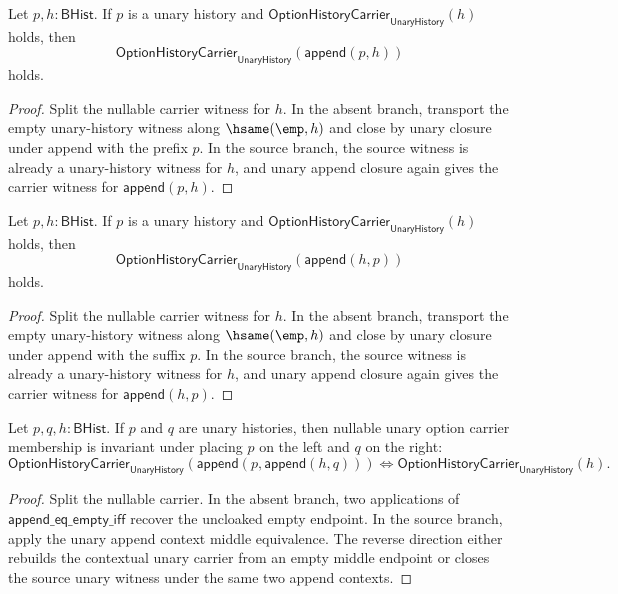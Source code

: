 \begin{theorem}
\label{thm:option-history-carrier-unary-prefix-closed}
Let $p,h:\mathsf{BHist}$. If $p$ is a unary history and
$\mathsf{OptionHistoryCarrier}_{\mathsf{UnaryHistory}}(h)$ holds, then
$$
\mathsf{OptionHistoryCarrier}_{\mathsf{UnaryHistory}}(\mathsf{append}(p,h))
$$
holds.
\end{theorem}
\begin{proof}
Split the nullable carrier witness for $h$. In the absent branch, transport
the empty unary-history witness along $\hsame(\emp,h)$ and close by unary
closure under append with the prefix $p$. In the source branch, the source
witness is already a unary-history witness for $h$, and unary append closure
again gives the carrier witness for $\mathsf{append}(p,h)$.
\end{proof}

\begin{theorem}
\label{thm:option-history-carrier-unary-suffix-closed}
Let $p,h:\mathsf{BHist}$. If $p$ is a unary history and
$\mathsf{OptionHistoryCarrier}_{\mathsf{UnaryHistory}}(h)$ holds, then
$$
\mathsf{OptionHistoryCarrier}_{\mathsf{UnaryHistory}}(\mathsf{append}(h,p))
$$
holds.
\end{theorem}
\begin{proof}
Split the nullable carrier witness for $h$. In the absent branch, transport
the empty unary-history witness along $\hsame(\emp,h)$ and close by unary
closure under append with the suffix $p$. In the source branch, the source
witness is already a unary-history witness for $h$, and unary append closure
again gives the carrier witness for $\mathsf{append}(h,p)$.
\end{proof}

\begin{theorem}
\label{thm:option-history-carrier-unary-append-context-iff}
Let $p,q,h:\mathsf{BHist}$. If $p$ and $q$ are unary histories, then nullable
unary option carrier membership is invariant under placing $p$ on the left and
$q$ on the right:
$$
\mathsf{OptionHistoryCarrier}_{\mathsf{UnaryHistory}}
  (\mathsf{append}(p,\mathsf{append}(h,q)))
\Longleftrightarrow
\mathsf{OptionHistoryCarrier}_{\mathsf{UnaryHistory}}(h).
$$
\end{theorem}
\begin{proof}
Split the nullable carrier. In the absent branch, two applications of
$\mathsf{append}\_\mathsf{eq}\_\mathsf{empty}\_\mathsf{iff}$ recover the
uncloaked empty endpoint. In the source branch, apply the unary append context
middle equivalence. The reverse direction either rebuilds the contextual unary
carrier from an empty middle endpoint or closes the source unary witness under
the same two append contexts.
\end{proof}

